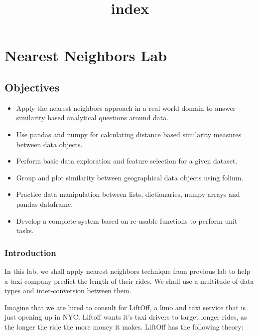 \documentclass[11pt]{article}
\title{index}
\providecommand{\tightlist}{%
      \setlength{\itemsep}{0pt}\setlength{\parskip}{0pt}}
\begin{document}
    
    
    \maketitle
    
    

    
    \section{Nearest Neighbors Lab}\label{nearest-neighbors-lab}

\subsection{Objectives}\label{objectives}

\begin{itemize}
\tightlist
\item
  Apply the nearest neighbors approach in a real world domain to answer
  similarity based analytical questions around data.
\item
  Use pandas and numpy for calculating distance based similarity
  measures between data objects.
\item
  Perform basic data exploration and feature selection for a given
  dataset.
\item
  Group and plot similarity between geographical data objects using
  folium.
\item
  Practice data manipulation between lists, dictionaries, numpy arrays
  and pandas dataframe.
\item
  Develop a complete system based on re-usable functions to perform unit
  tasks.
\end{itemize}

    \subsubsection{Introduction}\label{introduction}

In this lab, we shall apply nearest neighbors technique from previous
lab to help a taxi company predict the length of their rides. We shall
use a multitude of data types and inter-conversion between them.

Imagine that we are hired to consult for LiftOff, a limo and taxi
service that is just opening up in NYC. Liftoff wants it's taxi drivers
to target longer rides, as the longer the ride the more money it makes.
LiftOff has the following theory:
\end{document}
